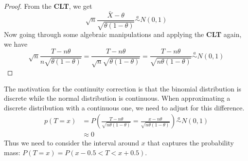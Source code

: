 \begin{proof}
    From the \textbf{CLT}, we get
    \begin{equation*}
        \sqrt{n}\frac{\bar{X}-\theta}{\sqrt{\theta(1-\theta)}}\overset{a}{\sim}N(0,1)
    \end{equation*}
    Now going through some algebraic manipulations and applying the \textbf{CLT} again, we have
    \begin{equation*}
        \sqrt{n}\frac{T-n\theta}{n\sqrt{\theta(1-\theta)}} = \frac{T-n\theta}{\sqrt{n}\sqrt{\theta(1-\theta)}} = \frac{T-n\theta}{\sqrt{n\theta(1-\theta)}}\overset{a}{\sim} N(0,1)
    \end{equation*}
\end{proof}

The motivation for the continuity correction is that the binomial distribution is discrete while the normal distribution is continuous.
When approximating a discrete distribution with a continuous one, we need to adjust for this difference.
\begin{align*}
    p(T=x) & = P\left(\frac{T-n\theta}{\sqrt{n\theta(1-\theta)}} = \frac{x-n\theta}{\sqrt{n\theta(1-\theta)}}\right)\overset{a}{\sim}N(0,1)\\
    & \approx 0
\end{align*}
Thus we need to consider the interval around $x$ that captures the probability mass: $P(T=x) = P(x-0.5<T<x+0.5)$.

